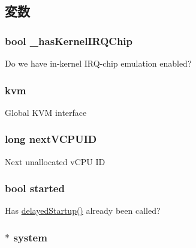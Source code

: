 \subsection{変数}
\hypertarget{classKvmVM_a7256488cd8c3b1c41c2417ade40cde88}{
\subsubsection[{\_\-hasKernelIRQChip}]{\setlength{\rightskip}{0pt plus 5cm}bool {\bf \_\-hasKernelIRQChip}}}
\label{classKvmVM_a7256488cd8c3b1c41c2417ade40cde88}
Do we have in-\/kernel IRQ-\/chip emulation enabled? \hypertarget{classKvmVM_a4169de9bdb8aa1afbeed2acc231dbb7f}{
\subsubsection[{kvm}]{ {\bf kvm}}}
\label{classKvmVM_a4169de9bdb8aa1afbeed2acc231dbb7f}
Global KVM interface \hypertarget{classKvmVM_a1739363b740f33ceef9f8187dd2078f1}{
\subsubsection[{nextVCPUID}]{\setlength{\rightskip}{0pt plus 5cm}long {\bf nextVCPUID}}}
\label{classKvmVM_a1739363b740f33ceef9f8187dd2078f1}
Next unallocated vCPU ID \hypertarget{classKvmVM_a43c08d193d555a2b2a61c53d2a4e5a63}{
\subsubsection[{started}]{\setlength{\rightskip}{0pt plus 5cm}bool {\bf started}}}
\label{classKvmVM_a43c08d193d555a2b2a61c53d2a4e5a63}
Has \hyperlink{classKvmVM_a508d2bd176120153c08b1fe4c7e2bc2c}{delayedStartup()} already been called? \hypertarget{classKvmVM_af27ccd765f13a4b7bd119dc7579e2746}{
\subsubsection[{system}]{$\ast$ {\bf system}}}
